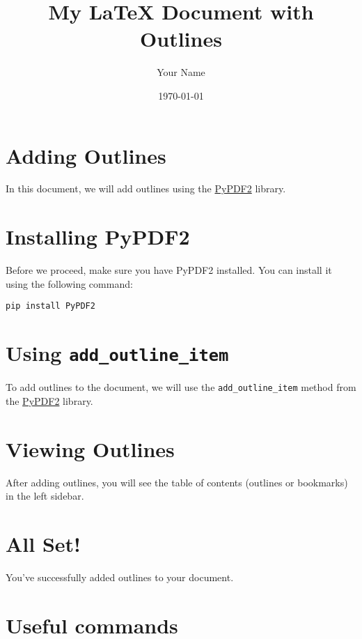 \documentclass{article}
\title{My LaTeX Document with Outlines}
\author{Your Name}
\date{\today}
\begin{document}
\maketitle


\newpage

\section{Adding Outlines}
In this document, we will add outlines using the \href{https://pypdf.readthedocs.io/en/stable/index.html}{PyPDF2} library.

\newpage

\section{Installing PyPDF2}
Before we proceed, make sure you have PyPDF2 installed. You can install it using the following command:

\texttt{pip install PyPDF2}

\newpage

\section{Using \texttt{add\_outline\_item}}
To add outlines to the document, we will use the \texttt{add\_outline\_item} method from the \href{https://pypdf.readthedocs.io/en/latest/modules/PdfMerger.html#pypdf.PdfMerger.add_outline_item}{PyPDF2} library.

\newpage

\section{Viewing Outlines}
After adding outlines, you will see the table of contents (outlines or bookmarks) in the left sidebar.

\newpage

\section{All Set!}
You've successfully added outlines to your document.

\newpage


\section{Useful commands}
\end{document}

